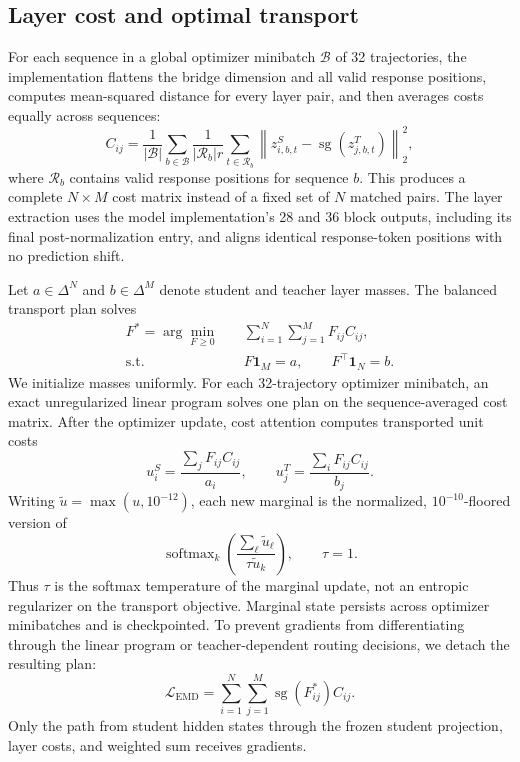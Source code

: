 \documentclass[10pt,twocolumn]{article}
\newcommand{\stopgrad}{\operatorname{sg}}
\begin{document}
\subsection{Layer cost and optimal transport}

For each sequence in a global optimizer minibatch $\mathcal{B}$ of 32 trajectories, the implementation flattens the bridge dimension and all valid response positions, computes mean-squared distance for every layer pair, and then averages costs equally across sequences:
\begin{equation}
C_{ij}=\frac{1}{|\mathcal{B}|}\sum_{b\in\mathcal{B}}
\frac{1}{|\mathcal{R}_b|r}\sum_{t\in\mathcal{R}_b}
\left\|z^S_{i,b,t}-\stopgrad(z^T_{j,b,t})\right\|_2^2,
\end{equation}
where $\mathcal{R}_b$ contains valid response positions for sequence $b$. This produces a complete $N\times M$ cost matrix instead of a fixed set of $N$ matched pairs. The layer extraction uses the model implementation's 28 and 36 block outputs, including its final post-normalization entry, and aligns identical response-token positions with no prediction shift.

Let $a\in\Delta^N$ and $b\in\Delta^M$ denote student and teacher layer masses. The balanced transport plan solves
\begin{align}
F^* = \arg\min_{F\geq 0} &\quad \sum_{i=1}^{N}\sum_{j=1}^{M}F_{ij}C_{ij},\\
\text{s.t.} &\quad F\mathbf{1}_M=a,\qquad F^\top\mathbf{1}_N=b.
\end{align}
We initialize masses uniformly. For each 32-trajectory optimizer minibatch, an exact unregularized linear program solves one plan on the sequence-averaged cost matrix. After the optimizer update, cost attention computes transported unit costs
\begin{equation}
u^S_i=\frac{\sum_jF_{ij}C_{ij}}{a_i},\qquad
u^T_j=\frac{\sum_iF_{ij}C_{ij}}{b_j}.
\end{equation}
Writing $\widetilde{u}=\max(u,10^{-12})$, each new marginal is the normalized, $10^{-10}$-floored version of
\begin{equation}
\operatorname{softmax}_k\!\left(
\frac{\sum_\ell\widetilde{u}_\ell}{\tau\widetilde{u}_k}
\right),\qquad \tau=1.
\end{equation}
Thus $\tau$ is the softmax temperature of the marginal update, not an entropic regularizer on the transport objective. Marginal state persists across optimizer minibatches and is checkpointed. To prevent gradients from differentiating through the linear program or teacher-dependent routing decisions, we detach the resulting plan:
\begin{equation}
\mathcal{L}_{\mathrm{EMD}}=
\sum_{i=1}^{N}\sum_{j=1}^{M}\stopgrad(F^*_{ij})C_{ij}.
\end{equation}
Only the path from student hidden states through the frozen student projection, layer costs, and weighted sum receives gradients.
\end{document}
